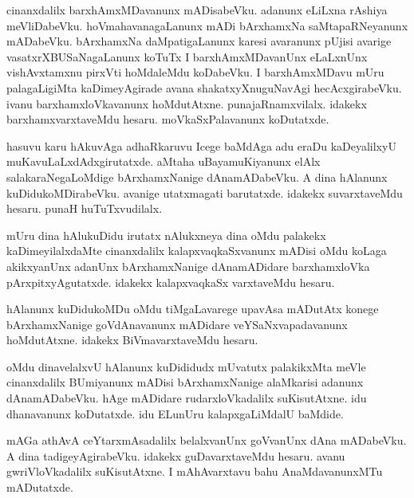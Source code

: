 \documentclass{article}
\begin{document}
\begin{mn}
cinanxdalilx  barxhAmxMDavanunx  mADisabeVku.  adanunx  eLiLxna rAshiya  meVliDabeVku.  
hoVmahavanagaLanunx  mADi  bArxhamxNa saMtapaRNeyanunx  mADabeVku.  bArxhamxNa 
daMpatigaLanunx  karesi  avaranunx  pUjisi  avarige  vasatxrXBUSaNagaLanunx  koTuTx  I  
barxhAmxMDavanUnx  eLaLxnUnx  vishAvxtamxnu  pirxVti  hoMdaleMdu  koDabeVku.  I  
barxhAmxMDavu  mUru  palagaLigiMta  kaDimeyAgirade  avana  shakatxyXnuguNavAgi  
hecAcxgirabeVku.  ivanu  barxhamxloVkavanunx  hoMdutAtxne.  punajaRnamxvilalx.  idakekx  
barxhamxvarxtaveMdu  hesaru.  moVkaSxPalavanunx  koDutatxde.
\end{mn}

\begin{mn}
hasuvu  karu hAkuvAga  adhaRkaruvu  Icege  baMdAga  adu  eraDu  kaDeyalilxyU  
muKavuLaLxdAdxgirutatxde.  aMtaha  uBayamuKiyanunx  elAlx  salakaraNegaLoMdige  
bArxhamxNanige  dAnamADabeVku.  A dina  hAlanunx  kuDidukoMDirabeVku.  avanige  
utatxmagati  barutatxde.  idakekx  suvarxtaveMdu  hesaru.  punaH  huTuTxvudilalx.  
\end{mn}

\begin{mn}
mUru  dina  hAlukuDidu  irutatx  nAlukxneya  dina  oMdu  palakekx  kaDimeyilalxdaMte  
cinanxdalilx  kalapxvaqkaSxvanunx  mADisi  oMdu  koLaga  akikxyanUnx  adanUnx  bArxhamxNanige  
dAnamADidare  barxhamxloVka pArxpitxyAgutatxde.  idakekx  kalapxvaqkaSx varxtaveMdu  hesaru.
\end{mn}

\begin{mn}
hAlanunx  kuDidukoMDu  oMdu  tiMgaLavarege  upavAsa mADutAtx  konege  bArxhamxNanige  
goVdAnavanunx  mADidare  veYSaNxvapadavanunx  hoMdutAtxne.  idakekx  BiVmavarxtaveMdu  hesaru.
\end{mn}

\begin{mn}
oMdu  dinavelalxvU  hAlanunx  kuDididudx  mUvatutx  palakikxMta  meVle  cinanxdalilx  BUmiyanunx  
mADisi  bArxhamxNanige  alaMkarisi  adanunx  dAnamADabeVku.  hAge  mADidare  rudarxloVkadalilx  
suKisutAtxne.  idu  dhanavanunx  koDutatxde.  idu  ELunUru  kalapxgaLiMdalU  baMdide.
\end{mn}

\begin{mn}
mAGa  athAvA  ceYtarxmAsadalilx  belalxvanUnx  goVvanUnx  dAna mADabeVku.  A  dina  
tadigeyAgirabeVku.  idakekx  guDavarxtaveMdu  hesaru.  avanu  gwriVloVkadalilx  
suKisutAtxne.  I  mAhAvarxtavu  bahu  AnaMdavanunxMTu mADutatxde.
\end{mn}
\end{document}
